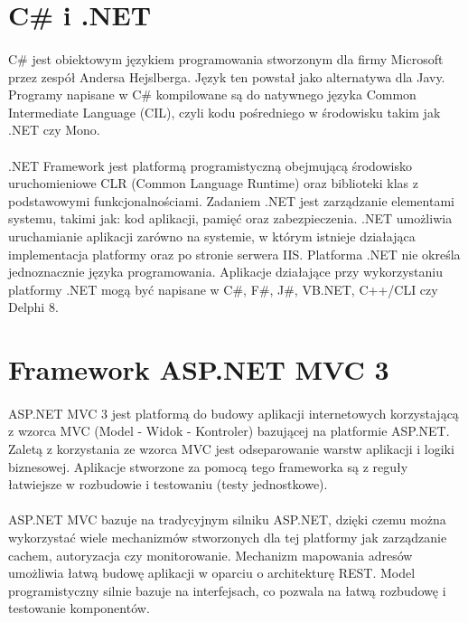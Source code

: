 \section{ C\# i .NET }
\label{sec:jezyk}
\paragraph{}
C\# jest obiektowym językiem programowania stworzonym dla firmy Microsoft przez zespół Andersa Hejslberga. Język ten powstał jako alternatywa dla Javy. Programy napisane w C\# kompilowane są do natywnego języka Common Intermediate Language (CIL), czyli kodu pośredniego w środowisku takim jak .NET czy Mono.
\paragraph{}
.NET Framework jest platformą programistyczną obejmującą środowisko uruchomieniowe CLR (Common Language Runtime) oraz biblioteki klas z podstawowymi funkcjonalnościami. Zadaniem .NET jest zarządzanie elementami systemu, takimi jak: kod aplikacji, pamięć oraz zabezpieczenia. .NET umożliwia uruchamianie aplikacji zarówno na systemie, w którym istnieje działająca implementacja platformy oraz po stronie serwera IIS. Platforma .NET nie określa jednoznacznie języka programowania. Aplikacje działające przy wykorzystaniu platformy .NET mogą być napisane w C\#, F\#, J\#, VB.NET, C++/CLI czy Delphi 8. 

\section{Framework ASP.NET MVC 3}

\paragraph{}
ASP.NET MVC 3 jest platformą do budowy aplikacji internetowych korzystającą z wzorca MVC (Model - Widok - Kontroler) bazującej na platformie ASP.NET. Zaletą z korzystania ze wzorca MVC jest odseparowanie warstw aplikacji i logiki biznesowej. Aplikacje stworzone za pomocą tego frameworka są z reguły łatwiejsze w rozbudowie i testowaniu (testy jednostkowe).

\paragraph{}
ASP.NET MVC bazuje na tradycyjnym silniku ASP.NET, dzięki czemu można wykorzystać wiele mechanizmów stworzonych dla tej platformy jak zarządzanie cachem, autoryzacja czy monitorowanie. Mechanizm mapowania adresów umożliwia łatwą budowę aplikacji w oparciu o architekturę REST. Model programistyczny silnie bazuje na interfejsach, co pozwala na łatwą rozbudowę i testowanie komponentów.

